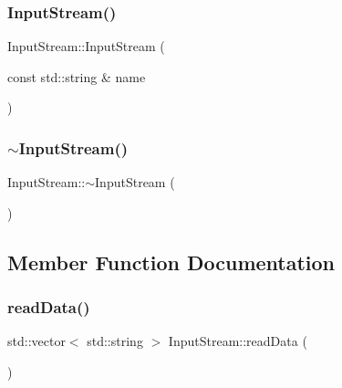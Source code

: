 \mbox{\label{class_input_stream_a5499ab72f052894993ba622f93641123}} 
\subsubsection{\texorpdfstring{InputStream()}{InputStream()}\hspace{0.1cm}{\footnotesize\ttfamily [2/2]}}
{\footnotesize\ttfamily Input\+Stream\+::\+Input\+Stream (\begin{DoxyParamCaption}\item[{const std\+::string \&}]{name }\end{DoxyParamCaption})}

\mbox{\label{class_input_stream_ae71831adce618d60783c287a2ac7075a}} 
\subsubsection{\texorpdfstring{$\sim$InputStream()}{~InputStream()}}
{\footnotesize\ttfamily Input\+Stream\+::$\sim$\+Input\+Stream (\begin{DoxyParamCaption}{ }\end{DoxyParamCaption})}



\subsection{Member Function Documentation}
\mbox{\label{class_input_stream_ad86e58ec31057d6e65ae289aabaab511}} 
\subsubsection{\texorpdfstring{readData()}{readData()}}
{\footnotesize\ttfamily std\+::vector$<$ std\+::string $>$ Input\+Stream\+::read\+Data (\begin{DoxyParamCaption}{ }\end{DoxyParamCaption})}

